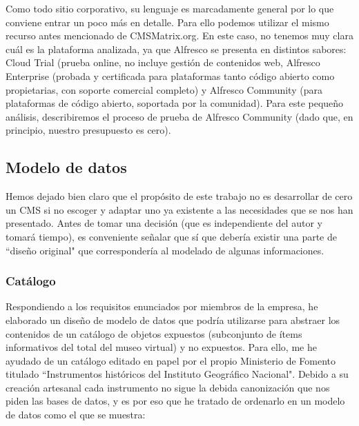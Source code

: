 \par Como todo sitio corporativo, su lenguaje es marcadamente general por lo que conviene entrar un poco más en detalle. Para ello podemos utilizar el mismo recurso antes mencionado de CMSMatrix.org\cite{refrences:alfrescocmsmat}. En este caso, no tenemos muy clara cuál es la plataforma analizada, ya que Alfresco se presenta en distintos sabores\cite{references:alfrescocomp}: Cloud Trial (prueba online, no incluye gestión de contenidos web, Alfresco Enterprise (probada y certificada para plataformas tanto código abierto como propietarias, con soporte comercial completo) y Alfresco Community (para plataformas de código abierto, soportada por la comunidad).
Para este pequeño análisis, describiremos el proceso de prueba de Alfresco Community (dado que, en principio, nuestro presupuesto es cero).

\subsection{Modelo de datos}
\par Hemos dejado bien claro que el propósito de este trabajo no es desarrollar de cero un CMS si no escoger y adaptar uno ya existente a las necesidades que se nos han presentado. Antes de tomar una decisión (que es independiente del autor y tomará tiempo), es conveniente señalar que sí que debería existir una parte de ``diseño original" que correspondería al modelado de algunas informaciones. 


\subsubsection{Catálogo}
\par Respondiendo a los requisitos enunciados por miembros de la empresa, he elaborado un diseño de modelo de datos que podría utilizarse para abstraer los contenidos de un catálogo de objetos expuestos (subconjunto de ítems informativos del total del museo virtual) y no expuestos.
Para ello, me he ayudado de un catálogo editado en papel por el propio Ministerio de Fomento titulado ``Instrumentos históricos del Instituto Geográfico Nacional". Debido a su creación artesanal cada instrumento no sigue la debida canonización que nos piden las bases de datos, y es por eso que he tratado de ordenarlo en un modelo de datos como el que se muestra:

